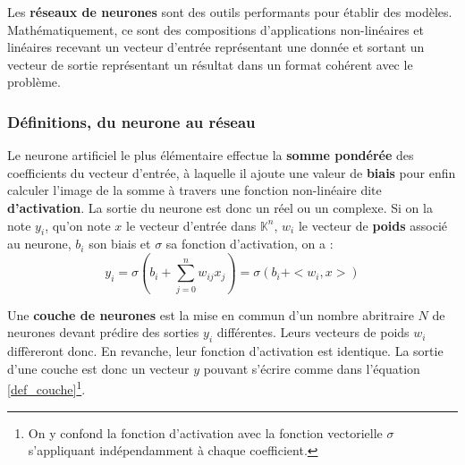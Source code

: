 \documentclass[12pt, french, twoside]{report}
\begin{document}
\vspace{12pt}
Les \textbf{réseaux de neurones} sont des outils performants pour établir des modèles. Mathématiquement, ce sont des compositions d'applications non-linéaires et linéaires recevant un vecteur d'entrée représentant une donnée et sortant un vecteur de sortie représentant un résultat dans un format cohérent avec le problème.

\subsubsection{Définitions, du neurone au réseau}
Le neurone artificiel le plus élémentaire effectue la \textbf{somme pondérée} des coefficients du vecteur d'entrée, à laquelle il ajoute une valeur de \textbf{biais} pour enfin calculer l'image de la somme à travers une fonction non-linéaire dite \textbf{d'activation}. La sortie du neurone est donc un réel ou un complexe. Si on la note $y_i$, qu'on note $x$ le vecteur d'entrée dans $\mathbb{K}^n$, $w_i$ le vecteur de \textbf{poids} associé au neurone, $b_i$ son biais et $\sigma$ sa fonction d'activation, on a :
\begin{equation}
    y_i = \sigma(b_i + \sum_{j=0}^{n} w_{ij}x_j) = \sigma(b_i + <w_i, x>)
\end{equation}\cite[section 1]{jurafsky_ffnn}

Une \textbf{couche de neurones} est la mise en commun d'un nombre abritraire $N$ de neurones devant prédire des sorties $y_i$ différentes. Leurs vecteurs de poids $w_i$ diffèreront donc. En revanche, leur fonction d'activation est identique. La sortie d'une couche est donc un vecteur $y$ pouvant s'écrire comme dans l'équation \ref{def_couche}\footnote{On y confond la fonction d'activation avec la fonction vectorielle $\sigma$ s'appliquant indépendamment à chaque coefficient.}.
\end{document}
